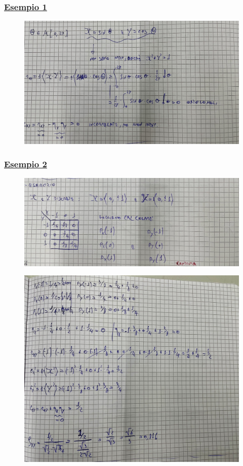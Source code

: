 \documentclass{article}
\begin{document}
\subsubsection{\underline{Esempio 1}}
\begin{figure}[ht]
\centering
\includegraphics[scale=0.13]{ese/51.jpeg}
\end{figure} 
\subsubsection{\underline{Esempio 2}}
\begin{figure}[ht]
\centering
\includegraphics[scale=0.13]{ese/52.jpeg}
\end{figure} 
\begin{figure}[ht]
\centering
\includegraphics[scale=0.13]{ese/52a.jpeg}
\end{figure}
\end{document}
